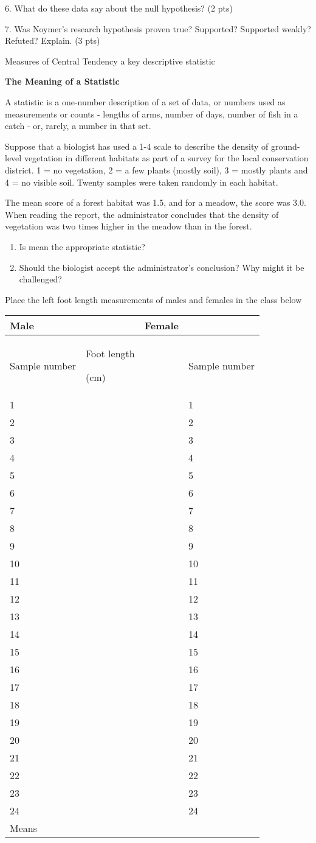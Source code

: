6. What do these data say about the null hypothesis? (2 pts)

7. Was Noymer's research hypothesis proven true? Supported? Supported
weakly? Refuted? Explain. (3 pts)

Measures of Central Tendency a key descriptive statistic

\textbf{The Meaning of a Statistic}

A statistic is a one-number description of a set of data, or numbers
used as measurements or counts - lengths of arms, number of days, number
of fish in a catch - or, rarely, a number in that set.

Suppose that a biologist has used a 1-4 scale to describe the density of
ground-level vegetation in different habitats as part of a survey for
the local conservation district. 1 = no vegetation, 2 = a few plants
(mostly soil), 3 = mostly plants and 4 = no visible soil. Twenty samples
were taken randomly in each habitat.

The mean score of a forest habitat was 1.5, and for a meadow, the score
was 3.0. When reading the report, the administrator concludes that the
density of vegetation was two times higher in the meadow than in the
forest.

\begin{enumerate}
\def\labelenumi{\arabic{enumi}.}
\item
  Is mean the appropriate statistic?
\item
  Should the biologist accept the administrator's conclusion? Why might
  it be challenged?
\end{enumerate}

Place the left foot length measurements of males and females in the
class below

\begin{longtable}[c]{@{}llll@{}}
\toprule
Male & & Female &\tabularnewline
\midrule
\endhead
Sample number & Foot length

(cm) & & Sample number\tabularnewline
1 & & & 1\tabularnewline
2 & & & 2\tabularnewline
3 & & & 3\tabularnewline
4 & & & 4\tabularnewline
5 & & & 5\tabularnewline
6 & & & 6\tabularnewline
7 & & & 7\tabularnewline
8 & & & 8\tabularnewline
9 & & & 9\tabularnewline
10 & & & 10\tabularnewline
11 & & & 11\tabularnewline
12 & & & 12\tabularnewline
13 & & & 13\tabularnewline
14 & & & 14\tabularnewline
15 & & & 15\tabularnewline
16 & & & 16\tabularnewline
17 & & & 17\tabularnewline
18 & & & 18\tabularnewline
19 & & & 19\tabularnewline
20 & & & 20\tabularnewline
21 & & & 21\tabularnewline
22 & & & 22\tabularnewline
23 & & & 23\tabularnewline
24 & & & 24\tabularnewline
Means & & &\tabularnewline
\bottomrule
\end{longtable}

